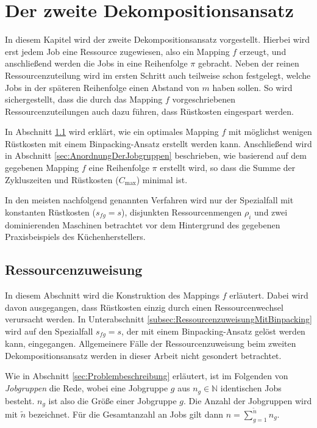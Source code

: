 \documentclass{scrreprt}
\begin{document}
\chapter{Der zweite Dekompositionsansatz}
\label{chap:DerZweiteDekompositionsansatz}
In diesem Kapitel wird der zweite Dekompositionsansatz vorgestellt.
Hierbei wird erst jedem Job eine Ressource zugewiesen, also ein Mapping $f$ erzeugt,
und anschließend werden die Jobs in eine Reihenfolge $\pi$ gebracht.
Neben der reinen Ressourcenzuteilung wird im ersten Schritt auch teilweise schon festgelegt, welche Jobs in der späteren Reihenfolge einen Abstand von $m$ haben sollen.
So wird sichergestellt, dass die durch das Mapping $f$ vorgeschriebenen Ressourcenzuteilungen auch dazu führen, dass Rüstkosten eingespart werden.

In Abschnitt \ref{sec:Ressourcenzuweisung} wird erklärt, wie ein optimales Mapping $f$ mit möglichst wenigen Rüstkosten mit einem Binpacking-Ansatz erstellt werden kann.
Anschließend wird in Abschnitt \ref{sec:AnordnungDerJobgruppen} beschrieben, wie basierend auf dem gegebenen Mapping $f$ eine Reihenfolge $\pi$ erstellt wird,
so dass die Summe der Zykluszeiten und Rüstkosten ($C_{\max}$) minimal ist.

In den meisten nachfolgend genannten Verfahren wird nur der Spezialfall mit konstanten Rüstkosten ($s_{fg}=s$),
disjunkten Ressourcenmengen $\rho_i$ und zwei dominierenden Maschinen betrachtet
vor dem Hintergrund des gegebenen Praxisbeispiels des Küchenherstellers.


\section{Ressourcenzuweisung}
\label{sec:Ressourcenzuweisung}
In diesem Abschnitt wird die Konstruktion des Mappings $f$ erläutert.
Dabei wird davon ausgegangen, dass Rüstkosten einzig durch einen Ressourcenwechsel verursacht werden.
In Unterabschnitt \ref{subsec:RessourcenzuweisungMitBinpacking} wird auf den Spezialfall $s_{fg}=s$, der mit einem Binpacking-Ansatz gelöst werden kann,
eingegangen. Allgemeinere Fälle der Ressourcenzuweisung beim zweiten Dekompositionsansatz werden in dieser Arbeit nicht gesondert betrachtet.

Wie in Abschnitt \ref{sec:Problembeschreibung} erläutert, ist im Folgenden von \textit{Jobgruppen} die Rede, 
wobei eine Jobgruppe $g$ aus $n_g\in\mathbb{N}$ identischen Jobs besteht.
$n_g$ ist also die Größe einer Jobgruppe $g$.
Die Anzahl der Jobgruppen wird mit $\tilde{n}$ bezeichnet.
Für die Gesamtanzahl an Jobs gilt dann $n = \sum_{g=1}^{\tilde{n}} n_g$.
\end{document}
